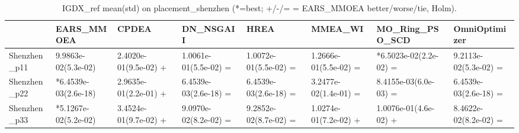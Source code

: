 \begin{table}[t]
\centering
\caption{IGDX_ref mean(std) on placement_shenzhen (*=best; +/-/= = EARS_MMOEA better/worse/tie, Holm).}
\label{tab:placement_shenzhen_IGDX_ref}
\begin{tabular}{llllllll}
\toprule
 & EARS\_MMOEA & CPDEA & DN\_NSGAII & HREA & MMEA\_WI & MO\_Ring\_PSO\_SCD & OmniOptimizer \\
\midrule
Shenzhen\_p11 & 9.9863e-02(5.3e-02) & 2.4020e-01(9.5e-02) + & 1.0061e-01(5.5e-02) = & 1.0072e-01(5.5e-02) = & 1.2666e-01(5.5e-02) = & *6.5023e-02(2.2e-02) = & 9.2113e-02(5.3e-02) = \\
Shenzhen\_p22 & *6.4539e-03(2.6e-18) & 2.9635e-01(2.2e-01) + & 6.4539e-03(2.6e-18) = & 6.4539e-03(2.6e-18) = & 3.2477e-02(1.4e-01) = & 8.4155e-03(6.0e-03) = & 6.4539e-03(2.6e-18) = \\
Shenzhen\_p33 & *5.1267e-02(5.2e-02) & 3.4524e-01(9.7e-02) + & 9.0970e-02(8.2e-02) = & 9.2852e-02(8.7e-02) = & 1.0274e-01(7.2e-02) + & 1.0076e-01(4.6e-02) + & 8.4622e-02(8.2e-02) = \\
\bottomrule
\end{tabular}
\end{table}
